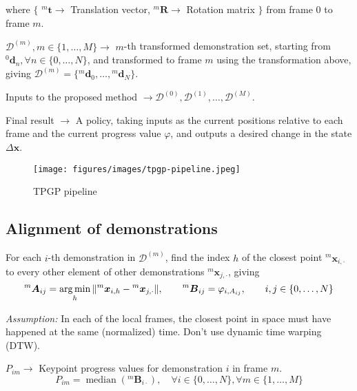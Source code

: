 where \( \big \{ \)
\( {}^{m}\boldsymbol{t} \to \) Translation vector, \( {}^{m}\boldsymbol{R} \to \) Rotation matrix \( \big \} \) from frame \( 0 \) to frame \( m \).

\( \mathcal{D}^{(m)}, m \in \{ 1, \ldots, M \} \to \) \( m \)-th transformed demonstration set, starting from \( {}^{0}\boldsymbol{d}_n, \forall n \in \{ 0, \ldots, N \} \), and transformed to frame \( m \) using the transformation above, giving \( \mathcal{D}^{(m)} = \{ {}^{m}\boldsymbol{d}_0, \ldots, {}^{m}\boldsymbol{d}_N \} \).

Inputs to the proposed method \( \to \mathcal{D}^{(0)}, \mathcal{D}^{(1)}, \ldots, \mathcal{D}^{(M)} \).

Final result \( \to \) A policy, taking inputs as the current positions relative to each frame and the current progress value \( \varphi \), and outputs a desired change in the state \( \Delta \boldsymbol{x} \).

\begin{figure}[htbp]
    \centering
    \texttt{[image: figures/images/tpgp-pipeline.jpeg]}
    \caption{
        TPGP pipeline
    }\label{fig:tpgp-pipeline}
\end{figure}

\subsection{Alignment of demonstrations}

For each \( i \)-th demonstration in \( \mathcal{D}^{(m)} \), find the index \( h \) of the closest point \( {}^{m}\boldsymbol{x}_{i, \cdot} \) to every other element of other demonstrations \( {}^{m}\boldsymbol{x}_{j, \cdot} \), giving
\begin{equation}
    {}^{m}\boldsymbol{A}_{ij} = \operatorname*{arg\,min}_{h} \Vert {}^{m}\boldsymbol{x}_{i, h} - {}^{m}\boldsymbol{x}_{j, \cdot} \Vert
    , \qquad
    {}^{m}\boldsymbol{B}_{ij} = \varphi_{i, A_{ij}}
    , \qquad
    i, j \in \{ 0, \ldots, N \}
\end{equation}

\textit{Assumption:} In each of the local frames, the closest point in space must have happened at the same (normalized) time.
Don't use dynamic time warping (DTW).

\( P_{im} \to \) Keypoint progress values for demonstration \( i \) in frame \( m \).
\begin{equation}
    P_{im} = \operatorname{median}({}^{m}\boldsymbol{B}_{i\cdot}), \quad \forall i \in \{ 0, \ldots, N \}, \forall m \in \{ 1, \ldots, M \}
\end{equation}

